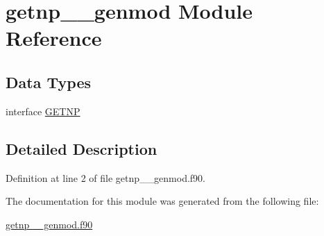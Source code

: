\hypertarget{classgetnp____genmod}{\section{getnp\+\_\+\+\_\+genmod Module Reference}
\label{classgetnp____genmod}
}
\subsection*{Data Types}
\begin{DoxyCompactItemize}
\item 
interface \hyperlink{interfacegetnp____genmod_1_1GETNP}{G\+E\+T\+N\+P}
\end{DoxyCompactItemize}


\subsection{Detailed Description}


Definition at line 2 of file getnp\+\_\+\+\_\+genmod.\+f90.



The documentation for this module was generated from the following file\+:\begin{DoxyCompactItemize}
\item 
\hyperlink{getnp____genmod_8f90}{getnp\+\_\+\+\_\+genmod.\+f90}\end{DoxyCompactItemize}
